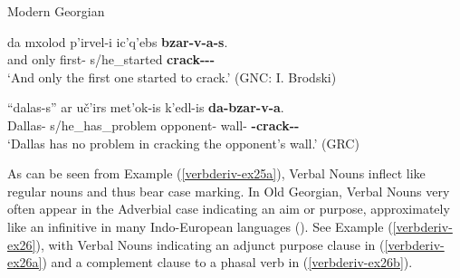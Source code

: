 \begin{exe}
	\ex\label{verbderiv-ex25}
	Modern Georgian 
	\begin{xlist}
		
		
			\ex\label{verbderiv-ex25a}
			\gll  da mxolod p'irvel-i ic'q'ebs \textbf{bzar-v-a-s}. \\
			and only first-{\Nom} s/he\_started \textbf{crack-{\Tm}-{\Vn}-{\Dat}} \\
			\trans `And only the first one started to crack.'
			\hfill (GNC: I. Brodski)
		
			\ex\label{verbderiv-ex25b}
			\gll  ``dalas-s'' ar uč'irs met'ok-is k'edl-is \textbf{da-bzar-v-a}. \\
			Dallas-{\Dat} {\Neg} s/he\_has\_problem opponent-{\Gen} wall-{\Gen} \textbf{{\Pv}-crack-{\Tm}-{\Vn}}\\
			\trans `Dallas has no problem in cracking the opponent's wall.'
			\hfill (GRC)
		
		
	\end{xlist}
\end{exe}

As can be seen from Example (\ref{verbderiv-ex25a}), Verbal Nouns inflect like regular nouns and thus bear case marking. In Old Georgian, Verbal Nouns very often appear in the Adverbial case indicating an aim or purpose, approximately like an infinitive in many Indo-European languages (\cites{gippertOGeo,kobaidzevamling}). See Example (\ref{verbderiv-ex26}), with Verbal Nouns indicating an adjunct purpose clause in (\ref{verbderiv-ex26a}) and a complement clause to a phasal verb in (\ref{verbderiv-ex26b}).




